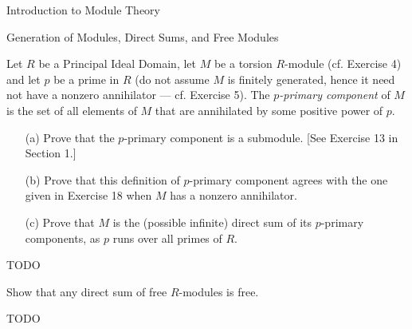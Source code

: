 \begin{chapter}{Introduction to Module Theory}
\begin{section}{Generation of Modules, Direct Sums, and Free Modules}
\begin{solution}
\end{solution}\oneperpage



\begin{problem}\label{ex:10.3.22}
Let $R$ be a Principal Ideal Domain, let $M$ be a torsion $R$-module (cf. Exercise 4) and let $p$ be a prime in $R$ (do not assume $M$ is finitely generated, hence it need not have a nonzero annihilator --- cf. Exercise 5). The \emph{$p$-primary component} of $M$ is the set of all elements of $M$ that are annihilated by some positive power of $p$.
\begin{enumerate}
\item[(a)] Prove that the $p$-primary component is a submodule. [See Exercise 13 in Section 1.]
\item[(b)] Prove that this definition of $p$-primary component agrees with the one given in Exercise 18 when $M$ has a nonzero annihilator.
\item[(c)] Prove that $M$ is the (possible infinite) direct sum of its $p$-primary components, as $p$ runs over all primes of $R$.
\end{enumerate}
\end{problem}
\begin{solution}TODO

\end{solution}\oneperpage



\begin{problem}\label{ex:10.3.23}
Show that any direct sum of free $R$-modules is free.
\end{problem}
\begin{solution}TODO

\end{solution}\oneperpage




\end{section}
\end{chapter}
